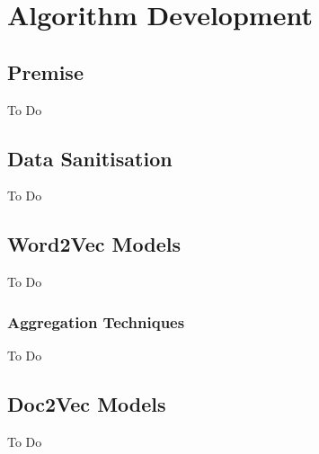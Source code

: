 \chapter{Algorithm Development}
\label{chapt:ALGORITHM}
\section{Premise}
To Do
\section{Data Sanitisation}
To Do
\section{Word2Vec Models}
To Do
\subsection{Aggregation Techniques}
To Do
\section{Doc2Vec Models}
To Do
